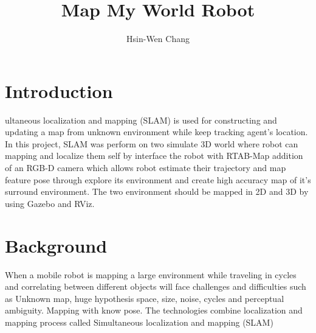 \documentclass[10pt,journal,compsoc]{IEEEtran}
\begin{document}
\title{Map My World Robot}

\author{Hsin-Wen Chang}

%
{}

\maketitle
\IEEEdisplaynontitleabstractindextext
\IEEEpeerreviewmaketitle
\section{Introduction}
\label{sec:introduction}

ultaneous localization and mapping (SLAM) is used for constructing and updating a map from unknown environment while keep tracking agent's location. In this project, SLAM was perform on two simulate 3D world where robot can mapping and localize them self by interface the robot with RTAB-Map addition of an RGB-D camera which allows robot estimate their trajectory and map feature pose through explore its environment and create high accuracy map of it's surround environment. The two environment should be mapped in 2D and 3D by using Gazebo and RViz.

\section{Background}
 When a mobile robot is mapping a large environment while traveling in cycles and correlating between different objects will face challenges and difficulties such as Unknown map, huge hypothesis space, size, noise, cycles and perceptual ambiguity. Mapping with know pose. The technologies combine localization and mapping process called Simultaneous localization and mapping (SLAM)\cite{lamport1994latex}
\end{document}
